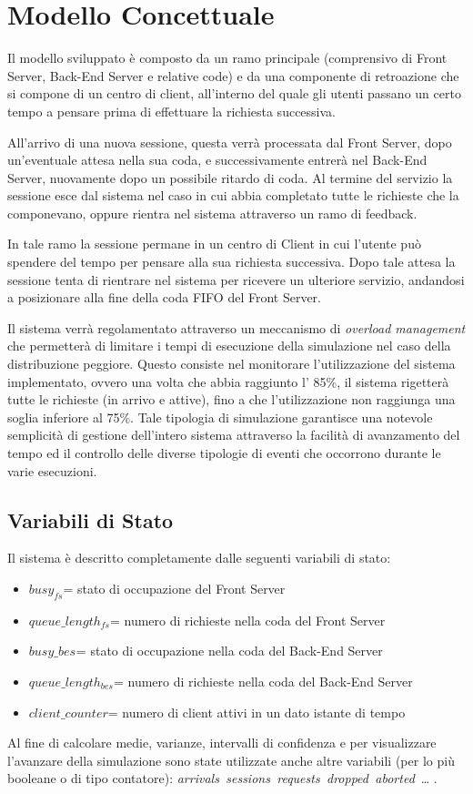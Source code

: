 
\chapter{Modello Concettuale}
 	\label{cap:modello concettuale}

Il modello sviluppato è composto da un ramo principale (comprensivo di Front Server, Back-End Server e relative code) e da una componente di retroazione che si compone di un centro di client, all'interno del quale gli utenti passano un certo tempo a pensare prima di effettuare la richiesta
successiva.

All'arrivo di una nuova sessione, questa verrà processata dal Front Server, dopo un’eventuale attesa nella sua coda, e successivamente entrerà nel Back-End Server, nuovamente dopo un possibile ritardo di coda. Al termine del servizio la sessione esce dal sistema nel caso in cui abbia completato tutte le richieste che la componevano, oppure rientra nel sistema attraverso un ramo di feedback.

In tale ramo la sessione permane in un centro di Client in cui l’utente può spendere del tempo per pensare alla sua richiesta successiva. Dopo tale attesa la sessione tenta di rientrare nel sistema per ricevere un ulteriore servizio, andandosi a posizionare alla fine della coda FIFO del Front Server.

Il sistema verrà regolamentato attraverso un meccanismo di \textit{overload management} che permetterà di limitare i tempi di esecuzione della simulazione nel caso della distribuzione peggiore. Questo consiste nel monitorare l'utilizzazione del sistema implementato, ovvero una volta che abbia raggiunto l' 85\%, il sistema rigetterà tutte le richieste (in arrivo e attive), fino a che l'utilizzazione non raggiunga una soglia inferiore al 75\%. Tale tipologia di simulazione garantisce una notevole semplicità di gestione dell'intero sistema attraverso la facilità di avanzamento del tempo ed il controllo delle diverse tipologie di eventi che occorrono durante le varie esecuzioni.

\section{Variabili di Stato}
Il sistema è descritto completamente dalle seguenti variabili di stato:
\begin{itemize}
\item $busy_{fs}^{}$= stato di occupazione del Front Server
\item $queue\_length_{fs}^{}$= numero di richieste nella coda del Front Server
\item $busy\_{bes}^{}$= stato di occupazione nella coda del Back-End Server
\item $queue\_length_{bes}^{}$= numero di richieste nella coda del Back-End Server
\item $client\_counter$= numero di client attivi in un dato istante di tempo

\end{itemize}
Al fine di calcolare medie, varianze, intervalli di confidenza e per visualizzare l'avanzare della simulazione sono state utilizzate anche altre variabili (per lo più booleane o di tipo contatore): \textit{arrivals\, sessions\, requests\, dropped\, aborted\,} … .
